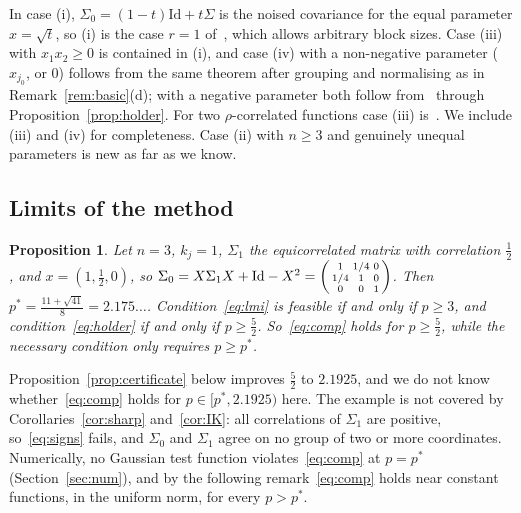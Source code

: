 \documentclass[11pt]{amsart}
\newtheorem{proposition}[theorem]{Proposition}
\theoremstyle{definition}
\newcommand{\Id}{\mathrm{Id}}
\begin{document}
In case (i), $\Sigma_0=(1-t)\Id+t\Sigma$ is the noised covariance for the equal parameter $x=\sqrt t$, so (i) is
the case $r=1$ of~\cite[Thm.~1.1]{FR}, which allows arbitrary block sizes. Case (iii) with $x_1x_2\ge0$ is contained in (i), and
case (iv) with a non-negative parameter ($x_{j_0}$, or $0$) follows from the same theorem after grouping and
normalising as in Remark~\ref{rem:basic}(d); with a negative parameter both follow from~\cite{CDP15} through
Proposition~\ref{prop:holder}. For two $\rho$-correlated functions case (iii) is~\cite[Prop.~6.1]{FR}. We include (iii) and (iv) for
completeness. Case (ii) with $n\ge3$ and genuinely unequal parameters is new as far as we know.

\subsection{Limits of the method}
\begin{proposition}\label{prop:example}
Let $n=3$, $k_j=1$, $\Sigma_1$ the equicorrelated matrix with correlation $\frac12$, and $x=(1,\frac12,0)$, so
$\Sigma_0=X\Sigma_1X+\Id-X^2=\begin{psmallmatrix}1&1/4&0\\1/4&1&0\\0&0&1\end{psmallmatrix}$. Then
$p^*=\frac{11+\sqrt{41}}8=2.175\ldots$. Condition~\eqref{eq:lmi} is feasible if and only if $p\ge3$, and
condition~\eqref{eq:holder} if and only if $p\ge\frac52$. So~\eqref{eq:comp} holds for $p\ge\frac52$, while the
necessary condition only requires $p\ge p^*$.
\end{proposition}

Proposition~\ref{prop:certificate} below improves $\frac52$ to $2.1925$, and we do not know whether~\eqref{eq:comp}
holds for $p\in[p^*,2.1925)$ here. The example is not covered by
Corollaries~\ref{cor:sharp} and~\ref{cor:IK}: all correlations of $\Sigma_1$ are positive, so~\eqref{eq:signs} fails,
and $\Sigma_0$ and $\Sigma_1$ agree on no group of two or more coordinates. Numerically, no Gaussian test
function violates~\eqref{eq:comp} at $p=p^*$ (Section~\ref{sec:num}), and by the following remark~\eqref{eq:comp} holds
near constant functions, in the uniform norm, for every $p>p^*$.
\end{document}
